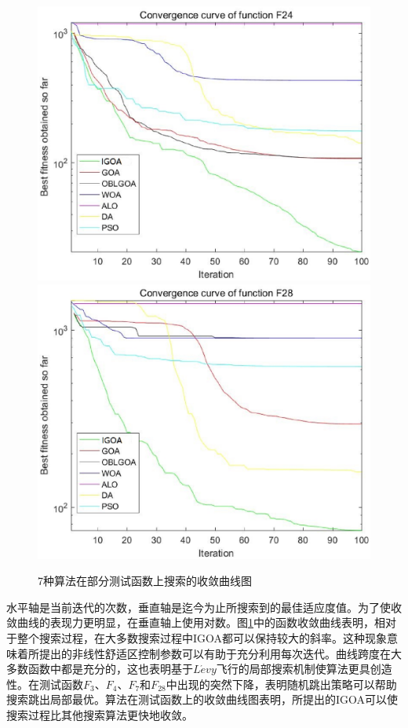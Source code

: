 \begin{figure}[htbp]
    \centering
    \includegraphics[width=.5\linewidth]{function_F24.eps}\hfill
    \includegraphics[width=.5\linewidth]{function_F28.eps}\hfill\\[0.5cm]

  \caption{7种算法在部分测试函数上搜索的收敛曲线图}
  \label{fig:IGOA_convergence_curve}
  \end{figure}


水平轴是当前迭代的次数，垂直轴是迄今为止所搜索到的最佳适应度值。为了使收敛曲线的表现力更明显，在垂直轴上使用对数。图\ref{fig:IGOA_convergence_curve}中的函数收敛曲线表明，相对于整个搜索过程，在大多数搜索过程中IGOA都可以保持较大的斜率。这种现象意味着所提出的非线性舒适区控制参数可以有助于充分利用每次迭代。曲线跨度在大多数函数中都是充分的，这也表明基于$L\acute{e}vy$飞行的局部搜索机制使算法更具创造性。在测试函数$F_3$、$F_4$、$F_7$和$F_{28}$中出现的突然下降，表明随机跳出策略可以帮助搜索跳出局部最优。算法在测试函数上的收敛曲线图表明，所提出的IGOA可以使搜索过程比其他搜索算法更快地收敛。

